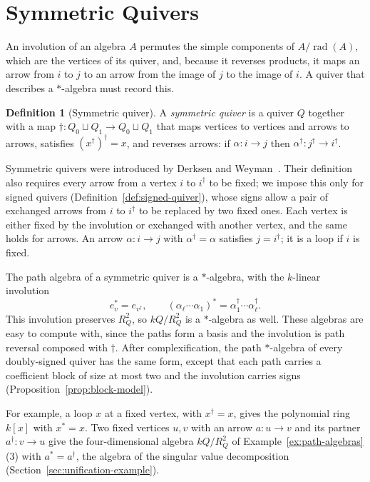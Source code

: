 \documentclass[12pt, a4paper]{report}
\theoremstyle{plain}
\theoremstyle{definition}
\newtheorem{definition}[theorem]{Definition}
\theoremstyle{remark}
\theoremstyle{plain}
\newcommand{\rad}[0]{\operatorname{rad}} %
\begin{document}
\section{Symmetric Quivers}
\label{sec:symmetric-quivers}
An involution of an algebra $A$ permutes the simple components of $A/\rad(A)$, which are the vertices of its quiver, and, because it reverses products, it maps an arrow from $i$ to $j$ to an arrow from the image of $j$ to the image of $i$. A quiver that describes a $*$-algebra must record this.

\begin{definition}[Symmetric quiver]\label{def:symmetric-quiver}
A \emph{symmetric quiver} is a quiver $Q$ together with a map $\dagger:Q_0\sqcup Q_1\to Q_0\sqcup Q_1$ that maps vertices to vertices and arrows to arrows, satisfies $(x^\dagger)^\dagger=x$, and reverses arrows: if $\alpha:i\to j$ then $\alpha^\dagger:j^\dagger\to i^\dagger$.
\end{definition}

Symmetric quivers were introduced by Derksen and Weyman~\cite{DerksenWeyman2002}. Their definition also requires every arrow from a vertex $i$ to $i^\dagger$ to be fixed; we impose this only for signed quivers (Definition~\ref{def:signed-quiver}), whose signs allow a pair of exchanged arrows from $i$ to $i^\dagger$ to be replaced by two fixed ones. Each vertex is either fixed by the involution or exchanged with another vertex, and the same holds for arrows. An arrow $\alpha:i\to j$ with $\alpha^\dagger=\alpha$ satisfies $j=i^\dagger$; it is a loop if $i$ is fixed.

The path algebra of a symmetric quiver is a $*$-algebra, with the $k$-linear involution
\[ e_v^*=e_{v^\dagger},\qquad (\alpha_\ell\cdots\alpha_1)^*=\alpha_1^\dagger\cdots\alpha_\ell^\dagger . \]
This involution preserves $R_Q^2$, so $kQ/R_Q^2$ is a $*$-algebra as well. These algebras are easy to compute with, since the paths form a basis and the involution is path reversal composed with $\dagger$. After complexification, the path $*$-algebra of every doubly-signed quiver has the same form, except that each path carries a coefficient block of size at most two and the involution carries signs (Proposition~\ref{prop:block-model}).

For example, a loop $x$ at a fixed vertex, with $x^\dagger=x$, gives the polynomial ring $k[x]$ with $x^*=x$. Two fixed vertices $u,v$ with an arrow $a:u\to v$ and its partner $a^\dagger:v\to u$ give the four-dimensional algebra $kQ/R_Q^2$ of Example~\ref{ex:path-algebras}(3) with $a^*=a^\dagger$, the algebra of the singular value decomposition (Section~\ref{sec:unification-example}).
\end{document}
